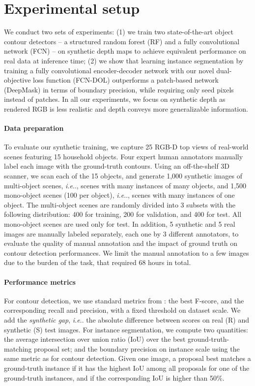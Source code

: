 \documentclass[runningheads,a4paper]{llncs}
\makeatletter
\DeclareRobustCommand\onedot{\futurelet\@let@token\@onedot}
\newcommand*\@onedot{\ifx\@let@token.\else.\null\fi\xspace}
\newcommand*\ie{\emph{i.e}\onedot} \newcommand*\Ie{\emph{I.e}\onedot}
\makeatother
\begin{document}
\section{Experimental setup}
\label{sec:setup}

We conduct two sets of experiments: (1) we train two state-of-the-art object contour detectors -- a structured random forest (RF) \cite{DollarZ14} and a fully convolutional network (FCN) \cite{Yang2016CEDN} -- on synthetic depth maps to achieve equivalent performance on real data at inference time; (2) we show that learning instance segmentation by training a fully convolutional encoder-decoder network with our novel dual-objective loss function (FCN-DOL) outperforms a patch-based network (DeepMask) \cite{SharpMask} in terms of boundary precision, while requiring only seed pixels instead of patches. In all our experiments, we focus on synthetic depth as rendered RGB is less realistic and depth conveys more generalizable information.

\paragraph{Data preparation}

To evaluate our synthetic training, we capture 25 RGB-D top views of real-world scenes featuring 15 household objects. Four expert human annotators manually label each image with the ground-truth contours. Using an off-the-shelf 3D scanner, we scan each of the 15 objects, and generate 1,000 synthetic images of multi-object scenes, \ie, scenes with many instances of many objects, and 1,500 mono-object scenes (100 per object), \ie, scenes with many instances of one object. The multi-object scenes are randomly divided into 3 subsets with the following distribution: 400 for training, 200 for validation, and 400 for test. All mono-object scenes are used only for test. In addition, 5 synthetic and 5 real images are manually labeled separately, each one by 3 different annotators, to evaluate the quality of manual annotation and the impact of ground truth on contour detection performances. We limit the manual annotation to a few images due to the burden of the task, that required 68 hours in total.

\paragraph{Performance metrics}

For contour detection, we use standard metrics from \cite{Arbelaez2011}: the best F-score, and the corresponding recall and precision, with a fixed threshold on dataset scale. We add the \emph{synthetic gap}, \ie the absolute difference between scores on real (R) and synthetic (S) test images. For instance segmentation, we compute two quantities: the average intersection over union ratio (IoU) over the best ground-truth-matching proposal set; and the boundary precision on instance scale using the same metric as for contour detection. Given one image, a proposal best matches a ground-truth instance if it has the highest IoU among all proposals for one of the ground-truth instances, and if the corresponding IoU is higher than 50\%.
\end{document}
